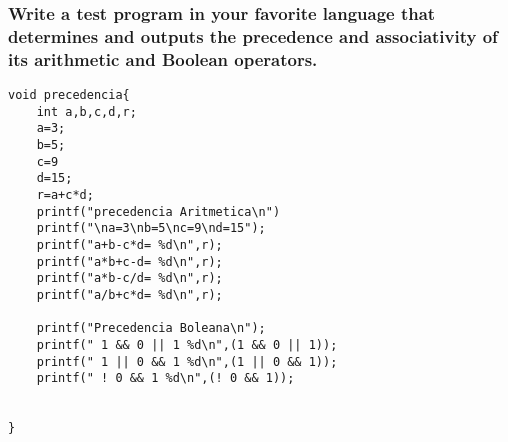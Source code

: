 \subsubsection{Write a test program in your favorite language that determines and outputs the precedence and associativity of its arithmetic and Boolean operators.}


\lstset{language = C} 
\begin{lstlisting}[frame = single] %Comienzo del Código
void precedencia{
	int a,b,c,d,r;
	a=3;
	b=5;
	c=9
	d=15;
	r=a+c*d;
	printf("precedencia Aritmetica\n")
	printf("\na=3\nb=5\nc=9\nd=15");
	printf("a+b-c*d= %d\n",r);
	printf("a*b+c-d= %d\n",r);
	printf("a*b-c/d= %d\n",r);
	printf("a/b+c*d= %d\n",r);
	
	printf("Precedencia Boleana\n");
	printf(" 1 && 0 || 1 %d\n",(1 && 0 || 1));
	printf(" 1 || 0 && 1 %d\n",(1 || 0 && 1));
	printf(" ! 0 && 1 %d\n",(! 0 && 1));
	
	
}
	
\end{lstlisting}
